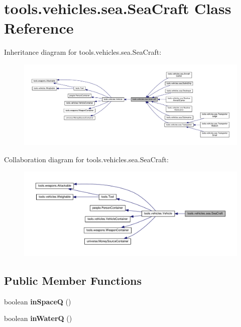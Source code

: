 \hypertarget{classtools_1_1vehicles_1_1sea_1_1_sea_craft}{}\section{tools.\+vehicles.\+sea.\+Sea\+Craft Class Reference}
\label{classtools_1_1vehicles_1_1sea_1_1_sea_craft}


Inheritance diagram for tools.\+vehicles.\+sea.\+Sea\+Craft\+:
\nopagebreak
\begin{figure}[H]
\begin{center}
\leavevmode
\includegraphics[width=350pt]{classtools_1_1vehicles_1_1sea_1_1_sea_craft__inherit__graph}
\end{center}
\end{figure}


Collaboration diagram for tools.\+vehicles.\+sea.\+Sea\+Craft\+:
\nopagebreak
\begin{figure}[H]
\begin{center}
\leavevmode
\includegraphics[width=350pt]{classtools_1_1vehicles_1_1sea_1_1_sea_craft__coll__graph}
\end{center}
\end{figure}
\subsection*{Public Member Functions}
\begin{DoxyCompactItemize}
\item 
boolean {\bfseries in\+SpaceQ} ()\hypertarget{classtools_1_1vehicles_1_1sea_1_1_sea_craft_a436a61781e073f8c119ef464375fe4a6}{}\label{classtools_1_1vehicles_1_1sea_1_1_sea_craft_a436a61781e073f8c119ef464375fe4a6}

\item 
boolean {\bfseries in\+WaterQ} ()\hypertarget{classtools_1_1vehicles_1_1sea_1_1_sea_craft_ae48192b6ec5d07e0570cec2cbe7d8828}{}\label{classtools_1_1vehicles_1_1sea_1_1_sea_craft_ae48192b6ec5d07e0570cec2cbe7d8828}

\end{DoxyCompactItemize}
